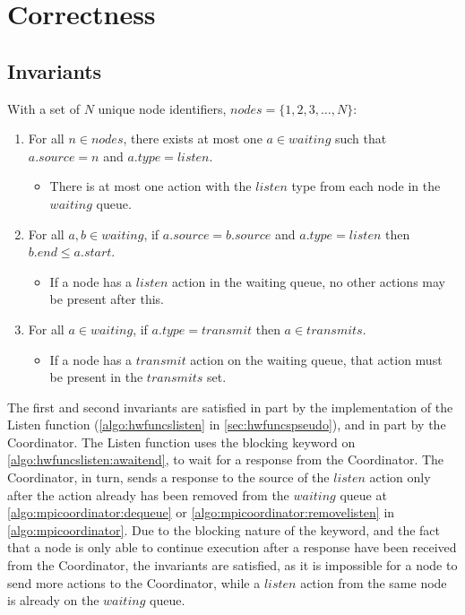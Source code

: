 \section{Correctness}

\subsection{Invariants}\label{sec:coordinator-invariants}

With a set of $N$ unique node identifiers, $nodes = \{ 1, 2, 3, \ldots, N \}$:

\begin{enumerate}
    \item For all $n \in nodes$, there exists at most one $a \in waiting$ such that $a.source = n$ and $a.type = listen$.
          \begin{itemize}
              \item There is at most one action with the $listen$ type from each node in the $waiting$ queue.
          \end{itemize}
    \item For all $a, b \in waiting$, if $a.source = b.source$ and $a.type = listen$ then $b.end \leq a.start$.
          \begin{itemize}
              \item If a node has a $listen$ action in the waiting queue, no other actions may be present after this.
          \end{itemize}
    \item For all $a \in waiting$, if $a.type = transmit$ then $a \in transmits$.
          \begin{itemize}
              \item If a node has a $transmit$ action on the waiting queue, that action must be present in the $transmits$ set.
          \end{itemize}
\end{enumerate}

The first and second invariants are satisfied in part by the implementation of the Listen function (\autoref{algo:hwfuncslisten} in \autoref{sec:hwfuncspseudo}), and in part by the Coordinator. The Listen function uses the blocking \KwAwait keyword on \autoref{algo:hwfuncslisten:awaitend}, to wait for a response from the Coordinator. The Coordinator, in turn, sends a response to the source of the $listen$ action only after the action already has been removed from the $waiting$ queue at \autoref{algo:mpicoordinator:dequeue} or \autoref{algo:mpicoordinator:removelisten} in \autoref{algo:mpicoordinator}. Due to the blocking nature of the \KwAwait keyword, and the fact that a node is only able to continue execution after a response have been received from the Coordinator, the invariants are satisfied, as it is impossible for a node to send more actions to the Coordinator, while a $listen$ action from the same node is already on the $waiting$ queue. \smallbreak

